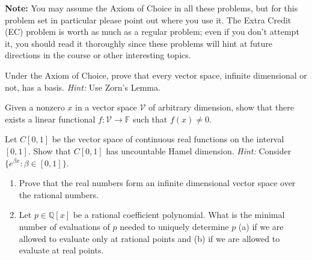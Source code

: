 \documentclass[12pt,letterpaper,cm]{hmcpset}
\begin{document}
\textbf{Note:} You may assume the Axiom of Choice in all these problems, but for this
problem set in particular please point out where you use it. The Extra Credit (EC) problem
is worth as much as a regular problem; even if you don't attempt it, you should read it thoroughly
since these problems will hint at future directions in the course or other interesting topics.

\begin{problem}[1]
    Under the Axiom of Choice, prove that every vector space, infinite dimensional or
    not, has a basis. \textit{Hint:} Use Zorn's Lemma.
\end{problem}

\begin{solution}
    \vfill
\end{solution}
\clearpage

\begin{problem}[2 (Lax 2.1)]
    Given a nonzero $x$ in a vector space $\mathcal{V}$ of arbitrary dimension, show that there
    exists a linear functional $f : \mathcal{V} \to \mathbb{F}$ such that $f(x)\neq 0$.
\end{problem}

\begin{solution}
    \vfill
\end{solution}

\begin{problem}[3]
    Let $C[0,1]$ be the vector space of continuous real functions on the interval $[0,1]$.
    Show that $C[0,1]$ has uncountable Hamel dimension. \textit{Hint:} Consider
    $\{e^{\beta x} : \beta\in[0,1]\}$.
\end{problem}

\begin{solution}
    \vfill
\end{solution}
\clearpage

\begin{problem}[4]
    \begin{enumerate}[(1)]
        \item Prove that the real numbers form an infinite dimensional vector space over the rational numbers.
        \item Let $p\in \mathbb{Q}[x]$ be a rational coefficient polynomial. What is the minimal
            number of evaluations of $p$ needed to uniquely determine $p$ (a) if we are allowed
            to evaluate only at rational points and (b) if we are allowed to evaluate at real points.
    \end{enumerate}
\end{problem}
\end{document}

